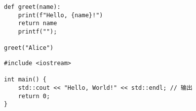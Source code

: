 \documentclass{article}
\begin{document}


\begin{verbatim}
def greet(name):
    print(f"Hello, {name}!")
    return name
    printf("");

greet("Alice")
\end{verbatim}

\begin{verbatim}
#include <iostream>

int main() {
    std::cout << "Hello, World!" << std::endl; // 输出
    return 0;
}

\end{verbatim}
\end{document}
